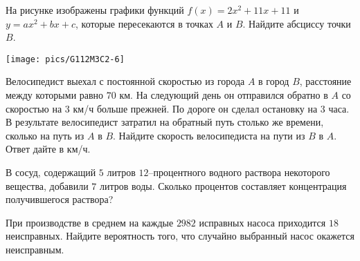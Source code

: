 \begin{class}[number=1]
\begin{listofex}
\begin{minipage}[c]{0.3\textwidth}
		\end{minipage}
		\item
		\begin{minipage}[t]{0.57\textwidth}
			На рисунке изображены графики функций \( f(x)=2x^2+11x+11 \) и \( y=ax^2+bx+c \), которые пересекаются в точках \( A \) и \( B \). Найдите абсциссу точки \( B \).
		\end{minipage}
		\begin{minipage}[c]{0.3\textwidth}
			\texttt{[image: pics/G112M3C2-6]}
		\end{minipage}
		\item Велосипедист выехал с постоянной скоростью из города \( A \) в город \( B \), расстояние между
		которыми равно \( 70 \) км. На следующий день он отправился обратно в \( A \) со скоростью на \( 3 \) км/ч больше прежней. По дороге он сделал остановку на \( 3 \) часа. В результате велосипедист затратил на обратный путь столько же времени, сколько на путь из \( A \) в \( B \). Найдите скорость велосипедиста на пути из \( B \) в \( A \). Ответ дайте в км/ч.
		\item В сосуд, содержащий \( 5 \) литров \( 12 \)--процентного водного раствора некоторого вещества,
		добавили \( 7 \) литров воды. Сколько процентов составляет концентрация получившегося раствора?
		\item При производстве в среднем на каждые \( 2982 \) исправных насоса приходится \( 18 \) неисправных.
		Найдите вероятность того, что случайно выбранный насос окажется неисправным.
	\end{listofex}
\end{class}
%
%
%
%
%
%
